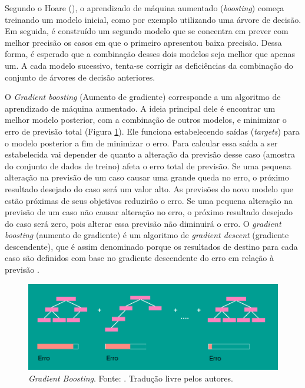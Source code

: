 Segundo o Hoare (\citeyear{Hoare:2019}), o aprendizado de máquina aumentado (\textit{boosting}) começa treinando um modelo inicial, como por exemplo utilizando uma árvore de decisão. Em seguida, é construído um segundo modelo que se concentra em prever com melhor precisão os casos em que o primeiro apresentou baixa precisão. Dessa forma, é esperado que a combinação desses dois modelos seja melhor que apenas um. A cada modelo sucessivo, tenta-se corrigir as deficiências da combinação do conjunto de árvores de decisão anteriores.

O \textit{Gradient boosting} (Aumento de gradiente) corresponde a um algoritmo de aprendizado de máquina aumentado. A ideia principal dele é encontrar um melhor modelo posterior, com a combinação de outros modelos, e minimizar o erro de previsão total (Figura \ref{fig:gradient_boosting}). Ele funciona estabelecendo saídas (\textit{targets}) para o modelo posterior a fim de minimizar o erro. Para calcular essa saída a ser estabelecida vai depender de quanto a alteração da previsão desse caso (amostra do conjunto de dados de treino) afeta o erro total de previsão. Se uma pequena alteração na previsão de um caso causar uma grande queda no erro, o próximo resultado desejado do caso será um valor alto. As previsões do novo modelo que estão próximas de seus objetivos reduzirão o erro. Se uma pequena alteração na previsão de um caso não causar alteração no erro, o próximo resultado desejado do caso será zero, pois alterar essa previsão não diminuirá o erro. O \textit{gradient boosting} (aumento de gradiente) é um algoritmo de \textit{gradient descent} (gradiente descendente), que é assim denominado porque os resultados de destino para cada caso são definidos com base no gradiente descendente do erro em relação à previsão \cite{Hoare:2019}.

\begin{figure}[H]
    \centering
    \includegraphics[scale=0.4]{figuras/referencial_teorico/gradient_boosting.png}
    \caption[Gradient Boosting]{\textit{Gradient Boosting}. Fonte: \cite{Chepenko:2019}. Tradução livre pelos autores.}
    \label{fig:gradient_boosting}
\end{figure}
 
